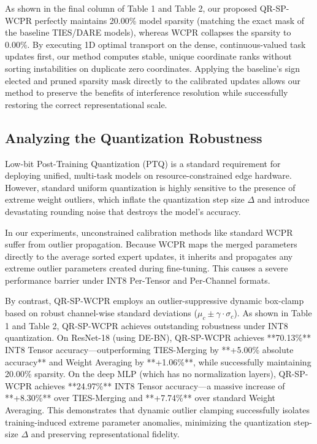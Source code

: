 \documentclass{article}
\theoremstyle{plain}
\theoremstyle{definition}
\theoremstyle{remark}
\begin{document}
As shown in the final column of Table 1 and Table 2, our proposed QR-SP-WCPR perfectly maintains 20.00\% model sparsity (matching the exact mask of the baseline TIES/DARE models), whereas WCPR collapses the sparsity to 0.00\%. By executing 1D optimal transport on the dense, continuous-valued task updates first, our method computes stable, unique coordinate ranks without sorting instabilities on duplicate zero coordinates. Applying the baseline's sign elected and pruned sparsity mask directly to the calibrated updates allows our method to preserve the benefits of interference resolution while successfully restoring the correct representational scale.

\subsection{Analyzing the Quantization Robustness}
Low-bit Post-Training Quantization (PTQ) is a standard requirement for deploying unified, multi-task models on resource-constrained edge hardware. However, standard uniform quantization is highly sensitive to the presence of extreme weight outliers, which inflate the quantization step size $\Delta$ and introduce devastating rounding noise that destroys the model's accuracy.

In our experiments, unconstrained calibration methods like standard WCPR suffer from outlier propagation. Because WCPR maps the merged parameters directly to the average sorted expert updates, it inherits and propagates any extreme outlier parameters created during fine-tuning. This causes a severe performance barrier under INT8 Per-Tensor and Per-Channel formats. 

By contrast, QR-SP-WCPR employs an outlier-suppressive dynamic box-clamp based on robust channel-wise standard deviations ($\mu_c \pm \gamma \cdot \sigma_c$). As shown in Table 1 and Table 2, QR-SP-WCPR achieves outstanding robustness under INT8 quantization. On ResNet-18 (using DE-BN), QR-SP-WCPR achieves **70.13\%** INT8 Tensor accuracy—outperforming TIES-Merging by **+5.00\% absolute accuracy** and Weight Averaging by **+1.06\%**, while successfully maintaining 20.00\% sparsity. On the deep MLP (which has no normalization layers), QR-SP-WCPR achieves **24.97\%** INT8 Tensor accuracy—a massive increase of **+8.30\%** over TIES-Merging and **+7.74\%** over standard Weight Averaging. This demonstrates that dynamic outlier clamping successfully isolates training-induced extreme parameter anomalies, minimizing the quantization step-size $\Delta$ and preserving representational fidelity.
\end{document}
